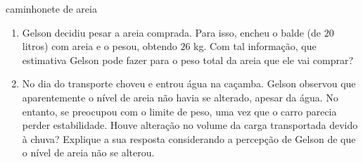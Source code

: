 \begin{task}{caminhonete de areia}
\begin{enumerate}
\item {} 
Gelson decidiu pesar a areia comprada. Para isso, encheu o balde (de $20$ litros) com areia e o pesou, obtendo \(26\) kg. Com tal informação, que estimativa Gelson pode fazer para o peso total da areia que ele vai comprar?

\item {} 
No dia do transporte choveu e entrou água na caçamba. Gelson observou que aparentemente o nível de areia não havia se alterado, apesar da água. No entanto, se preocupou com o limite de peso, uma vez que o carro parecia perder estabilidade. Houve alteração no volume da carga transportada devido à chuva? Explique a sua resposta considerando a percepção de Gelson de que o nível de areia não se alterou.

\end{enumerate}
\end{task}

